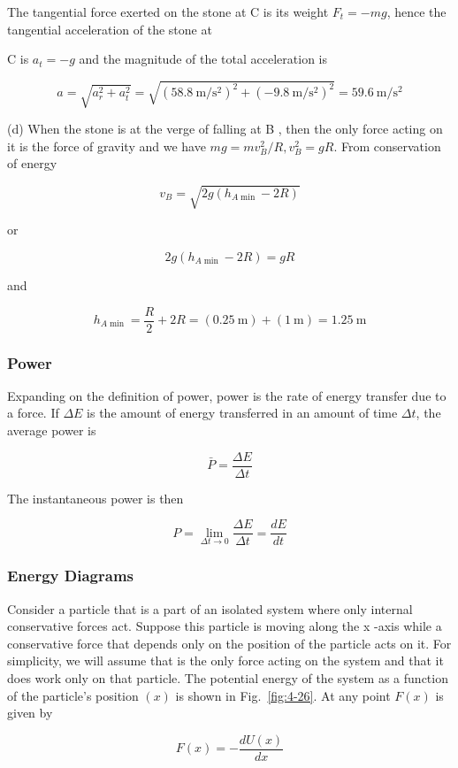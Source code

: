 \documentclass[10pt]{article}
\numberwithin{equation}{section}
\begin{document}
The tangential force exerted on the stone at C is its weight $F_{t}=-m g$, hence the tangential acceleration of the stone at

C is $a_{t}=-g$ and the magnitude of the total acceleration is

$$
a=\sqrt{a_{r}^{2}+a_{t}^{2}}=\sqrt{\left(58.8 \mathrm{~m} / \mathrm{s}^{2}\right)^{2}+\left(-9.8 \mathrm{~m} / \mathrm{s}^{2}\right)^{2}}=59.6 \mathrm{~m} / \mathrm{s}^{2}
$$

(d) When the stone is at the verge of falling at B , then the only force acting on it is the force of gravity and we have $m g=m v_{B}^{2} / R, v_{B}^{2}=g R$. From conservation of energy

$$
v_{B}=\sqrt{2 g\left(h_{A \min }-2 R\right)}
$$

or

$$
2 g\left(h_{A \min }-2 R\right)=g R
$$

and

$$
h_{A \min }=\frac{R}{2}+2 R=(0.25 \mathrm{~m})+(1 \mathrm{~m})=1.25 \mathrm{~m}
$$

\subsubsection{Power}\label{sec:4-5-5}
Expanding on the definition of power, power is the rate of energy transfer due to a force. If $\Delta E$ is the amount of energy transferred in an amount of time $\Delta t$, the average power is

$$
\bar{P}=\frac{\Delta E}{\Delta t}
$$

The instantaneous power is then

$$
P=\lim _{\Delta t \rightarrow 0} \frac{\Delta E}{\Delta t}=\frac{d E}{d t}
$$

\subsubsection{Energy Diagrams}\label{sec:4-5-6}
Consider a particle that is a part of an isolated system where only internal conservative forces act. Suppose this particle is moving along the x -axis while a conservative force that depends only on the position of the particle acts on it. For simplicity, we will assume that is the only force acting on the system and that it does work only on that particle. The potential energy of the system as a function of the particle's position $(x)$ is shown in Fig.~\ref{fig:4-26}. At any point $F(x)$ is given by

$$
F(x)=-\frac{d U(x)}{d x}
$$
\end{document}
